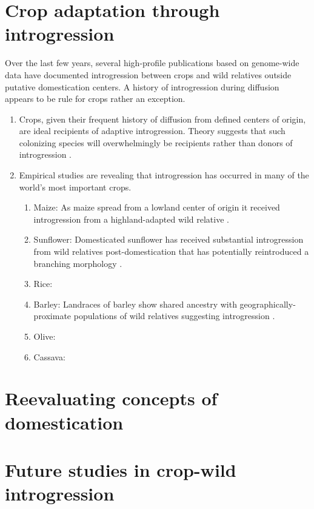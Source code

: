 \documentclass[11pt]{article}
\begin{document}
\section*{Crop adaptation through introgression}
Over the last few years, several high-profile publications based on genome-wide data have documented introgression between crops and wild relatives outside putative domestication centers. A history of introgression during diffusion appears to be rule for crops rather an exception.
\begin{enumerate}
	\item{Crops, given their frequent history of diffusion from defined centers of origin, are ideal recipients of adaptive introgression. Theory suggests that such colonizing species will overwhelmingly be recipients rather than donors of introgression \cite{Currat2008}.}
	\item{Empirical studies are revealing that introgression has occurred in many of the world's most important crops.}
	\begin{enumerate}
		\item{Maize: As maize spread from a lowland center of origin it received introgression from a highland-adapted wild relative \cite{Hufford2013}.}
		\item{Sunflower: Domesticated sunflower has received substantial introgression from wild relatives post-domestication that has potentially reintroduced a branching morphology \cite{Baute2015}.}
		\item{Rice: \cite{Huang2012}}
		\item{Barley: Landraces of barley show shared ancestry with geographically-proximate populations of wild relatives suggesting introgression \cite{Poets2015}.}
		\item{Olive: \cite{Diez2015}}
		\item{Cassava: \cite{Bredeson2016}}
	\end{enumerate}
\end{enumerate}

\section*{Reevaluating concepts of domestication}

\section*{Future studies in crop-wild introgression}


\end{document}
